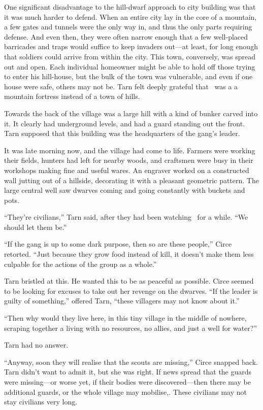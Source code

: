 One significant disadvantage to the hill-dwarf approach to city building was that it was much harder to defend.  When an entire city lay in the core of a mountain, a few gates and tunnels were the only way in, and thus the only parts requiring defense.  And even then, they were often narrow enough that a few well-placed barricades and traps would suffice to keep invaders out---at least, for long enough that soldiers could arrive from within the city.  This town, conversely, was spread out and open.  Each individual homeowner might be able to hold off those trying to enter his hill-house, but the bulk of the town was vulnerable, and even if one house were safe, others may not be.  Tarn felt deeply grateful that \korbarthrond\ was a a mountain fortress instead of a town of hills.

Towards the back of the village was a large hill with a kind of bunker carved into it.  It clearly had underground levels, and had a guard standing out the front.  Tarn supposed that this building was the headquarters of the gang's leader.

It was late morning now, and the village had come to life.  Farmers were working their fields, hunters had left for nearby woods, and craftsmen were busy in their workshops making fine and useful wares.  An engraver worked on a constructed wall jutting out of a hillside, decorating it with a pleasant geometric pattern.  The large central well saw dwarves coming and going constantly with buckets and pots.

``They're civilians,'' Tarn said, after they had been watching \tholkunrond\ for a while.  ``We should let them be.''

``If the gang is up to some dark purpose, then so are these people,'' Circe retorted.  ``Just because they grow food instead of kill, it doesn't make them less culpable for the actions of the group as a whole.''

Tarn bristled at this.  He wanted this to be as peaceful as possible.  Circe seemed to be looking for excuses to take out her revenge on the dwarves.  ``If the leader is guilty of something,'' offered Tarn, ``these villagers may not know about it.''

``Then why would they live here, in this tiny village in the middle of nowhere, scraping together a living with no resources, no allies, and just a well for water?''

Tarn had no answer.

``Anyway, soon they will realise that the scouts are missing,'' Circe snapped back.  Tarn didn't want to admit it, but she was right.  If news spread that the guards were missing---or worse yet, if their bodies were discovered---then there may be additional guards, or the whole village may mobilise,.  These civilians may not stay civilians very long.


